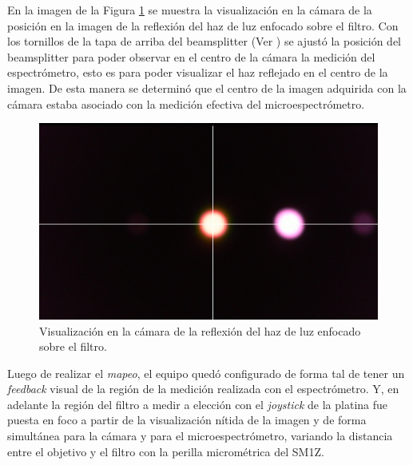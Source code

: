  En la imagen de la Figura \ref{fig:refhazz} se muestra la visualización en la cámara de la posición en la imagen de la reflexión del haz de luz enfocado sobre el filtro. Con los tornillos de la tapa de arriba del beamsplitter (Ver \href{https://www.thorlabs.com/images/TabImages/Kinematic\_Cube\_Platform\_A1-780.jpg}{\faImage}) se ajustó la posición del beamsplitter para poder observar en el centro de la cámara la medición del espectrómetro, esto es para poder visualizar el haz reflejado en el centro de la imagen. De esta manera se determinó que el centro de la imagen adquirida con la cámara estaba asociado con la medición efectiva del microespectrómetro.

\begin{figure}[H]
	\centering
	\includegraphics[scale=0.5]{Figs/microespectrometro/mapspectrometrocamera.png}
	\caption{Visualización en la cámara de la reflexión del haz de luz enfocado sobre el filtro.}
	\label{fig:refhazz}
\end{figure}

Luego de realizar el \textit{mapeo}, el equipo quedó configurado de forma tal de tener un \textit{feedback} visual de la región de la medición realizada con el espectrómetro. Y, en adelante la región del filtro a medir a elección con el \textit{joystick} de la platina fue puesta en foco a partir de la visualización nítida de la imagen y de forma simultánea para la cámara y para el microespectrómetro, variando la distancia entre el objetivo y el filtro con la perilla micrométrica del SM1Z.



